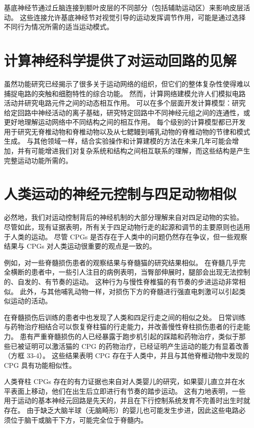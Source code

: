 基底神经节通过丘脑连接到额叶皮层的不同部分（包括辅助运动区）来影响皮层活动。 这些连接允许基底神经节对视觉引导的运动发挥调节作用，可能是通过选择不同行为情况所需的适当运动模式。


\section{计算神经科学提供了对运动回路的见解}

虽然功能研究已经揭示了很多关于运动网络的组织，但它们的整体复杂性使得难以捕捉电路的突触和细胞特性的综合功能。 然而，计算网络建模允许人们模拟电路活动并研究电路元件之间的动态相互作用。 可以在多个层面开发计算模型：研究给定回路中神经活动的离子基础，研究特定回路中不同神经元组之间的连通性，或更好地理解运动网络中不同结构之间的相互作用。 每个级别的计算模型都已开发用于研究无脊椎动物和脊椎动物以及从七鳃鳗到哺乳动物的脊椎动物的节律和模式生成。 与其他领域一样，结合实验操作和计算建模的方法在未来几年可能会增加，并有可能增进我们对复杂系统和结构之间相互联系的理解，而这些结构是产生完整运动功能所需的。


\section{人类运动的神经元控制与四足动物相似}

必然地，我们对运动控制背后的神经机制的大部分理解来自对四足动物的实验。 尽管如此，现有证据表明，所有关于四足动物行走的起源和调节的主要原则也适用于人类的运动。 尽管 CPGs 是否存在于人类中的问题仍然存在争议，但一些观察结果与 CPGs 对人类运动很重要的观点是一致的。

例如，对一些脊髓损伤患者的观察结果与脊髓猫的研究结果相似。 在脊髓几乎完全横断的患者中，一些引人注目的病例表明，当臀部伸展时，腿部会出现无法控制的、自发的、有节奏的运动。 这种行为与慢性脊椎猫的有节奏的步进运动非常相似。 此外，与其他哺乳动物一样，对损伤下方的脊髓进行强直电刺激可以引起类似运动的活动。

在脊髓损伤后训练的患者中也发现了人类和四足行走之间的相似之处。 日常训练与药物治疗相结合可以恢复脊柱猫的行走能力，并改善慢性脊柱损伤患者的行走能力。 患有严重脊髓损伤的人已经暴露于跑步机引起的踩踏和药物治疗，类似于那些已被证明可以激活猫的 CPG 的药物治疗，已经证明产生运动的能力有显着改善（方框 33-4）。 这些结果表明 CPG 存在于人类中，并且与其他脊椎动物中发现的 CPG 具有功能相似性。

人类脊柱 CPGs 存在的有力证据也来自对人类婴儿的研究，如果婴儿直立并在水平表面上移动，他们在出生后立即进行有节奏的踏步运动。 这有力地表明，一些用于运动的基本神经元回路是先天的，并且在下行控制系统发育不完善时出生时就存在。 由于缺乏大脑半球（无脑畸形）的婴儿也可能发生步进，因此这些电路必须位于脑干或脑干下方，可能完全位于脊髓内。

